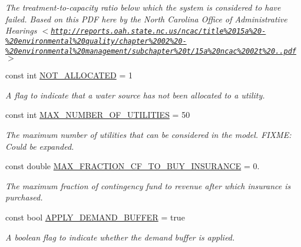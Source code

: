 \begin{DoxyCompactItemize}
\begin{DoxyCompactList}\small\item\em The treatment-\/to-\/capacity ratio below which the system is considered to have failed. Based on this P\+DF here by the {\ttfamily North Carolina Office of Administrative Hearings $<$\href{http://reports.oah.state.nc.us/ncac/title%2015a%20-%20environmental%20quality/chapter%2002%20-%20environmental%20management/subchapter%20t/15a%20ncac%2002t%20.0118.pdf}{\tt http\+://reports.\+oah.\+state.\+nc.\+us/ncac/title\%2015a\%20-\/\%20environmental\%20quality/chapter\%2002\%20-\/\%20environmental\%20management/subchapter\%20t/15a\%20ncac\%2002t\%20.\+0118.\+pdf}$>$} \end{DoxyCompactList}\item 
const int \mbox{\hyperlink{classConstants_a2cc0fab82afeeae81786ee3a0ce6ffd5}{N\+O\+T\+\_\+\+A\+L\+L\+O\+C\+A\+T\+ED}} = 1
\begin{DoxyCompactList}\small\item\em A flag to indicate that a water source has not been allocated to a utility. \end{DoxyCompactList}\item 
const int \mbox{\hyperlink{classConstants_a456bb204b432ca85d517cdf525f19f88}{M\+A\+X\+\_\+\+N\+U\+M\+B\+E\+R\+\_\+\+O\+F\+\_\+\+U\+T\+I\+L\+I\+T\+I\+ES}} = 50
\begin{DoxyCompactList}\small\item\em The maximum number of utilities that can be considered in the model. F\+I\+X\+ME\+: Could be expanded. \end{DoxyCompactList}\item 
const double \mbox{\hyperlink{classConstants_a17512938d5dc372ac321263e35d4022e}{M\+A\+X\+\_\+\+F\+R\+A\+C\+T\+I\+O\+N\+\_\+\+C\+F\+\_\+\+T\+O\+\_\+\+B\+U\+Y\+\_\+\+I\+N\+S\+U\+R\+A\+N\+CE}} = 0.
\begin{DoxyCompactList}\small\item\em The maximum fraction of contingency fund to revenue after which insurance is purchased. \end{DoxyCompactList}\item 
const bool \mbox{\hyperlink{classConstants_a6d0d721f1c6d8807ddeb8b80eb165108}{A\+P\+P\+L\+Y\+\_\+\+D\+E\+M\+A\+N\+D\+\_\+\+B\+U\+F\+F\+ER}} = true
\begin{DoxyCompactList}\small\item\em A boolean flag to indicate whether the demand buffer is applied. \end{DoxyCompactList}\item 

\end{DoxyCompactItemize}
